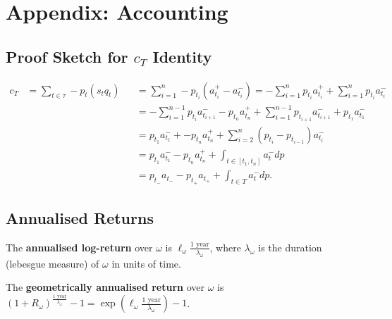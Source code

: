\documentclass{article}
\begin{document}



\section{Appendix: Accounting}
\subsection{Proof Sketch for $c_T$ Identity}
\begin{align*}
		c_{T}	&= \sum_{t\in\tau} - p_t (s_t q_t)	&&= \sum_{i=1}^n - p_{t_i} (a_{t_i}^+-a_{t_i}^-) = - \sum_{i=1}^n p_{t_i} a_{t_i}^+ + \sum_{i=1}^n p_{t_i} a_{t_i}^-
	\\		&					&&= - \sum_{i=1}^{n-1} p_{t_i} a_{t_{i+1}}^- - p_{t_n} a_{t_n}^+ + \sum_{i=1}^{n-1} p_{t_{i+1}} a_{t_{i+1}}^- + p_{t_1}a_{t_1}^-
	\\		&					&&= p_{t_1}a_{t_1}^- + - p_{t_n} a_{t_n}^+ + \sum_{i=2}^n (p_{t_i}-p_{t_{i-1}}) a_{t_i}^-
	\\		&					&&= p_{t_1}a_{t_1}^- - p_{t_n}a_{t_n}^+ + \int_{t\in[t_1,t_n]} a_t^- dp
	\\		&					&&= p_{t_-}a_{t_-} - p_{t_+}a_{t_+} + \int_{t\in T} a_t^- dp.
\end{align*}

\subsection{Annualised Returns}
The \textbf{annualised log-return} over $\omega$ is $\ell_\omega \frac{\textrm{1 year}}{\lambda_\omega}$, where $\lambda_\omega$ is the duration (lebesgue measure) of $\omega$ in units of time.%

The \textbf{geometrically annualised return} over $\omega$ is $(1 + R_\omega)^\frac{\textrm{1 year}}{\lambda_\omega} - 1 = \exp\left(\ell_\omega \frac{\textrm{1 year}}{\lambda_\omega}\right) - 1$.
\end{document}
